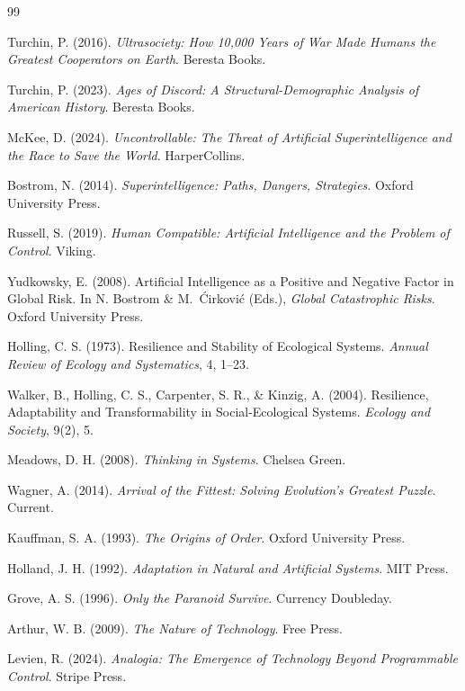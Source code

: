 \documentclass[12pt, a4paper]{article}
\theoremstyle{plain}
\theoremstyle{definition}
\theoremstyle{remark}
\begin{document}
\begin{thebibliography}{99}

Turchin, P. (2016). \textit{Ultrasociety: How 10,000 Years of War Made Humans the Greatest Cooperators on Earth}. Beresta Books.

Turchin, P. (2023). \textit{Ages of Discord: A Structural-Demographic Analysis of American History}. Beresta Books.

McKee, D. (2024). \textit{Uncontrollable: The Threat of Artificial Superintelligence and the Race to Save the World}. HarperCollins.

Bostrom, N. (2014). \textit{Superintelligence: Paths, Dangers, Strategies}. Oxford University Press.

Russell, S. (2019). \textit{Human Compatible: Artificial Intelligence and the Problem of Control}. Viking.

Yudkowsky, E. (2008). Artificial Intelligence as a Positive and Negative Factor in Global Risk. In N. Bostrom \& M.\ \'{C}irkovi\'{c} (Eds.), \textit{Global Catastrophic Risks}. Oxford University Press.

Holling, C. S. (1973). Resilience and Stability of Ecological Systems. \textit{Annual Review of Ecology and Systematics}, 4, 1--23.

Walker, B., Holling, C. S., Carpenter, S. R., \& Kinzig, A. (2004). Resilience, Adaptability and Transformability in Social-Ecological Systems. \textit{Ecology and Society}, 9(2), 5.

Meadows, D. H. (2008). \textit{Thinking in Systems}. Chelsea Green.

Wagner, A. (2014). \textit{Arrival of the Fittest: Solving Evolution's Greatest Puzzle}. Current.

Kauffman, S. A. (1993). \textit{The Origins of Order}. Oxford University Press.

Holland, J. H. (1992). \textit{Adaptation in Natural and Artificial Systems}. MIT Press.

Grove, A. S. (1996). \textit{Only the Paranoid Survive}. Currency Doubleday.

Arthur, W. B. (2009). \textit{The Nature of Technology}. Free Press.

Levien, R. (2024). \textit{Analogia: The Emergence of Technology Beyond Programmable Control}. Stripe Press.


\end{thebibliography}
\end{document}
